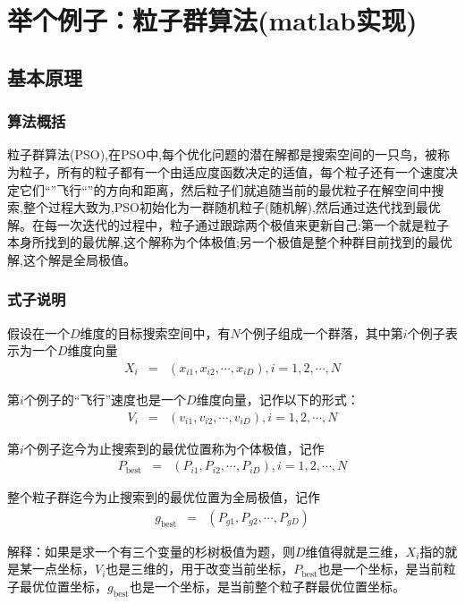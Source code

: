 \pagestyle{headings}
\chapter{举个例子：粒子群算法(matlab实现)}
\section{基本原理}
\subsection{算法概括}
粒子群算法(PSO),在PSO中,每个优化问题的潜在解都是搜索空间的一只鸟，被称为粒子，所有的粒子都有一个由适应度函数决定的适值，每个粒子还有一个速度决定它们“”飞行“”的方向和距离，然后粒子们就追随当前的最优粒子在解空间中搜索,整个过程大致为,PSO初始化为一群随机粒子(随机解),然后通过迭代找到最优解。在每一次迭代的过程中，粒子通过跟踪两个极值来更新自己:第一个就是粒子本身所找到的最优解,这个解称为个体极值;另一个极值是整个种群目前找到的最优解,这个解是全局极值。
\subsection{式子说明}
假设在一个$D$维度的目标搜索空间中，有$N$个例子组成一个群落，其中第$i$个例子表示为一个$D$维度向量
\begin{eqnarray}
    X_{i}&=&\left(x_{i1},x_{i2},\cdots,x_{iD}\right),i=1,2,\cdots,N
\end{eqnarray}

第$i$个例子的“飞行”速度也是一个$D$维度向量，记作以下的形式：
\begin{eqnarray}
    V_{i}&=&\left(v_{i1},v_{i2},\cdots,v_{iD}\right),i=1,2,\cdots,N
\end{eqnarray}

第$i$个例子迄今为止搜索到的最优位置称为个体极值，记作
\begin{eqnarray}
    P_{\text{best}}&=&\left(P_{i1},P_{i2},\cdots,P_{iD}\right),i=1,2,\cdots,N
\end{eqnarray}

整个粒子群迄今为止搜索到的最优位置为全局极值，记作
\begin{eqnarray}
    g_{\text{best}}&=&\left(P_{g1},P_{g2},\cdots,P_{gD}\right)
\end{eqnarray}

解释：如果是求一个有三个变量的杉树极值为题，则$D$维值得就是三维，$X_{i}$指的就是某一点坐标，$V_{i}$也是三维的，用于改变当前坐标，$P_{\text{best}}$也是一个坐标，是当前粒子最优位置坐标，$g_{\text{best}}$也是一个坐标，是当前整个粒子群最优位置坐标。

